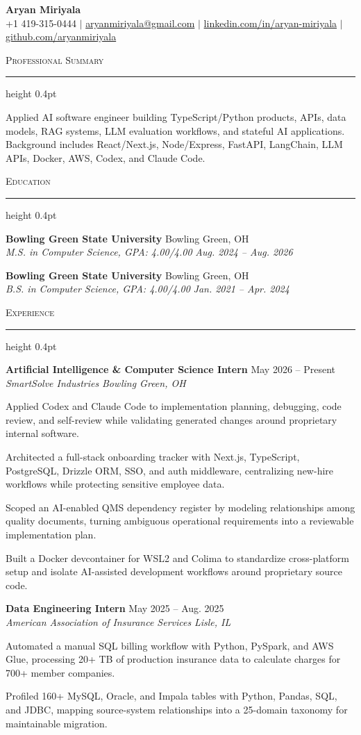 \documentclass[letterpaper,11pt]{article}
\newcommand{\resumesection}[1]{%
  \par\vspace{2pt}%
  {\large\scshape #1}\par\vspace{2pt}%
  \hrule height 0.4pt\vspace{2pt}%
}
\newcommand{\resumeSubheading}[4]{
  \textbf{#1} \hfill #2\\
  \textit{#3} \hfill \textit{#4}
}
\begin{document}
\begin{center}
  {\LARGE \textbf{Aryan Miriyala}}\\[-1pt]
  \small
  +1 419-315-0444 $|$
  \href{mailto:aryanmiriyala@gmail.com}{aryanmiriyala@gmail.com} $|$
  \href{https://www.linkedin.com/in/aryan-miriyala-7788a21b6/}{linkedin.com/in/aryan-miriyala} $|$
  \href{https://github.com/aryanmiriyala}{github.com/aryanmiriyala}
\end{center}\vspace{-10pt}

\resumesection{Professional Summary}
Applied AI software engineer building TypeScript/Python products, APIs, data models, RAG systems, LLM evaluation workflows, and stateful AI applications. Background includes React/Next.js, Node/Express, FastAPI, LangChain, LLM APIs, Docker, AWS, Codex, and Claude Code.

\resumesection{Education}
\resumeSubheading
{Bowling Green State University}{Bowling Green, OH}
{M.S. in Computer Science, GPA: 4.00/4.00}{Aug. 2024 -- Aug. 2026}

\resumeSubheading
{Bowling Green State University}{Bowling Green, OH}
{B.S. in Computer Science, GPA: 4.00/4.00}{Jan. 2021 -- Apr. 2024}

\resumesection{Experience}
\resumeSubheading
{Artificial Intelligence \& Computer Science Intern}{May 2026 -- Present}
{SmartSolve Industries}{Bowling Green, OH}
\begin{tightitemize}
  \item Applied Codex and Claude Code to implementation planning, debugging, code review, and self-review while validating generated changes around proprietary internal software.
  \item Architected a full-stack onboarding tracker with Next.js, TypeScript, PostgreSQL, Drizzle ORM, SSO, and auth middleware, centralizing new-hire workflows while protecting sensitive employee data.
  \item Scoped an AI-enabled QMS dependency register by modeling relationships among quality documents, turning ambiguous operational requirements into a reviewable implementation plan.
  \item Built a Docker devcontainer for WSL2 and Colima to standardize cross-platform setup and isolate AI-assisted development workflows around proprietary source code.
\end{tightitemize}

\resumeSubheading
{Data Engineering Intern}{May 2025 -- Aug. 2025}
{American Association of Insurance Services}{Lisle, IL}
\begin{tightitemize}
  \item Automated a manual SQL billing workflow with Python, PySpark, and AWS Glue, processing 20+ TB of production insurance data to calculate charges for 700+ member companies.
  \item Profiled 160+ MySQL, Oracle, and Impala tables with Python, Pandas, SQL, and JDBC, mapping source-system relationships into a 25-domain taxonomy for maintainable migration.
\end{tightitemize}
\end{document}

